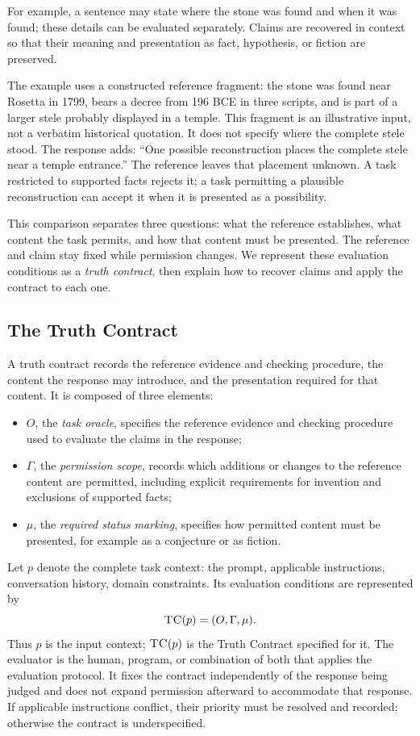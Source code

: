 \documentclass{clv2025}
\newcommand{\TC}{\textsc{TC}}
\begin{document}
For example, a sentence may state where the
stone was found and when it was found; these details can be evaluated
separately. Claims are recovered in context so that their meaning and
presentation as fact, hypothesis, or fiction are preserved.

The example uses a constructed reference fragment: the stone was found
near Rosetta in 1799, bears a decree from 196 BCE in three scripts, and is
part of a larger stele probably displayed in a temple. This fragment is an
illustrative input, not a verbatim historical quotation. It does not specify
where the complete stele stood. The response adds: ``One possible
reconstruction places the complete stele near a temple entrance.'' The
reference leaves that placement unknown. A task restricted to supported
facts rejects it; a task permitting a plausible reconstruction can accept
it when it is presented as a possibility.

This comparison separates three questions: what the reference establishes,
what content the task permits, and how that content must be presented.
The reference and claim stay fixed while permission changes. We represent
these evaluation conditions as a \emph{truth contract}, then explain how
to recover claims and apply the contract to each one.

\subsection{The Truth Contract}\label{subsec:contract}

A truth contract records the reference evidence and checking procedure,
the content the response may introduce, and the presentation required for
that content. It is composed of three elements:
\begin{itemize}
\item $O$, the \emph{task oracle}, specifies the reference evidence and
checking procedure used to evaluate the claims in the response;
\item $\Gamma$, the \emph{permission scope}, records which additions or
changes to the reference content are permitted, including explicit
requirements for invention and exclusions of supported facts;
\item $\mu$, the \emph{required status marking}, specifies how permitted
content must be presented, for example as a conjecture or as fiction.
\end{itemize}
Let $p$ denote the complete task context: the prompt, applicable instructions,
conversation history, domain constraints. Its evaluation
conditions are represented by
\begin{equation}
\TC(p)=(O,\Gamma,\mu).
\label{eq:truth-contract}
\end{equation}
Thus $p$ is the input context; $\TC(p)$ is the Truth Contract specified for it.
The evaluator is the human, program, or combination of both that applies
the evaluation protocol. It fixes the contract independently of the response
being judged and does not expand permission afterward to accommodate that
response. If applicable instructions conflict, their priority must be
resolved and recorded; otherwise the contract is underspecified.
\end{document}
